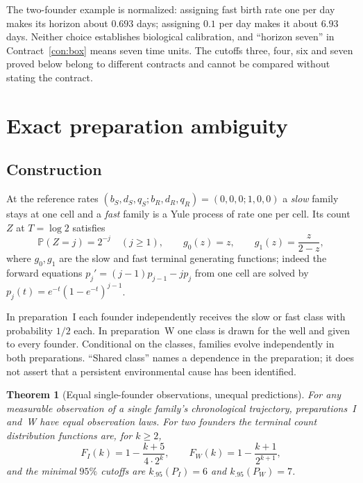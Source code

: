 \documentclass[11pt,a4paper]{article}
\theoremstyle{plain}
\newtheorem{theorem}{Theorem}[section]
\theoremstyle{definition}
\theoremstyle{remark}
\newcommand{\PP}{\mathbb P}
\begin{document}
The two-founder example is normalized: assigning fast birth rate one per day makes its horizon about $0.693$ days; assigning $0.1$ per day makes it about $6.93$ days. Neither choice establishes biological calibration, and ``horizon seven'' in Contract~\ref{con:box} means seven time units. The cutoffs three, four, six and seven proved below belong to different contracts and cannot be compared without stating the contract.

\section{Exact preparation ambiguity}\label{sec:ambiguity}

\subsection{Construction}
At the reference rates $(b_S,d_S,q_S;b_R,d_R,q_R)=(0,0,0;1,0,0)$ a \emph{slow} family stays at one cell and a \emph{fast} family is a Yule process of rate one per cell. Its count $Z$ at $T=\log2$ satisfies
\begin{equation}\label{eq:yule}
\PP(Z=j)=2^{-j}\quad(j\ge1),\qquad g_0(z)=z,\qquad g_1(z)=\frac{z}{2-z},
\end{equation}
where $g_0,g_1$ are the slow and fast terminal generating functions; indeed the forward equations $p_j'=(j-1)p_{j-1}-jp_j$ from one cell are solved by $p_j(t)=e^{-t}(1-e^{-t})^{j-1}$.

In preparation~I each founder independently receives the slow or fast class with probability $1/2$ each. In preparation~W one class is drawn for the well and given to every founder. Conditional on the classes, families evolve independently in both preparations. ``Shared class'' names a dependence in the preparation; it does not assert that a persistent environmental cause has been identified.

\begin{theorem}[Equal single-founder observations, unequal predictions]\label{thm:ambiguity}
For any measurable observation of a single family's chronological trajectory, preparations~I and~W have equal observation laws. For two founders the terminal count distribution functions are, for $k\ge2$,
\begin{equation}\label{eq:cdf}
F_I(k)=1-\frac{k+5}{4\cdot2^k},\qquad F_W(k)=1-\frac{k+1}{2^{k+1}},
\end{equation}
and the minimal $95\%$ cutoffs are $k_{.95}(P_I)=6$ and $k_{.95}(P_W)=7$.
\end{theorem}
\end{document}
